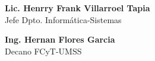 \documentclass[letterpaper,11pt]{article}
\begin{document}
\vspace{4cm}

\begin{minipage}[b]{0.5\textwidth}
\begin{center}
{\bf Lic. Henrry Frank Villarroel Tapia}\\
Jefe Dpto. Informática-Sistemas\\
\end{center}
\end{minipage}
\begin{minipage}[b]{0.5\textwidth}
\begin{center}
{\bf Ing. Hernan Flores Garcia}\\
Decano FCyT-UMSS\\
\end{center}
\end{minipage}
\end{document}
